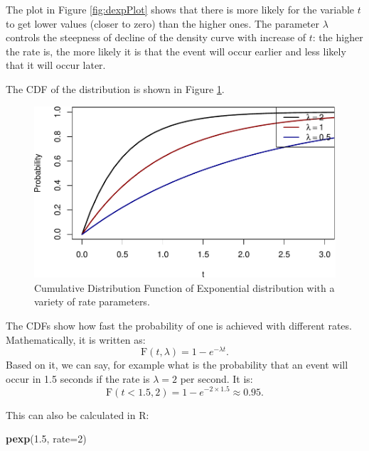 \documentclass[
]{book}
\newenvironment{Shaded}{\begin{snugshade}}{\end{snugshade}}
\newcommand{\DataTypeTok}[1]{\textcolor[rgb]{0.13,0.29,0.53}{#1}}
\newcommand{\DecValTok}[1]{\textcolor[rgb]{0.00,0.00,0.81}{#1}}
\newcommand{\FloatTok}[1]{\textcolor[rgb]{0.00,0.00,0.81}{#1}}
\newcommand{\KeywordTok}[1]{\textcolor[rgb]{0.13,0.29,0.53}{\textbf{#1}}}
\newcommand{\NormalTok}[1]{#1}
\theoremstyle{definition}
\theoremstyle{definition}
\theoremstyle{definition}
\theoremstyle{definition}
\theoremstyle{remark}
\begin{document}
The plot in Figure \ref{fig:dexpPlot} shows that there is more likely for the variable \(t\) to get lower values (closer to zero) than the higher ones. The parameter \(\lambda\) controls the steepness of decline of the density curve with increase of \(t\): the higher the rate is, the more likely it is that the event will occur earlier and less likely that it will occur later.

The CDF of the distribution is shown in Figure \ref{fig:pexpPlot}.

\begin{figure}
\centering
\includegraphics{Svetunkov---Statistics-for-Business-Analytics_files/figure-latex/pexpPlot-1.pdf}
\caption{\label{fig:pexpPlot}Cumulative Distribution Function of Exponential distribution with a variety of rate parameters.}
\end{figure}

The CDFs show how fast the probability of one is achieved with different rates. Mathematically, it is written as:
\begin{equation}
    \mathrm{F}(t, \lambda) = 1 - e^{- \lambda t}.
    \label{eq:ExponentialCDF}
\end{equation}
Based on it, we can say, for example what is the probability that an event will occur in 1.5 seconds if the rate is \(\lambda=2\) per second. It is:
\begin{equation*}
    \mathrm{F}(t < 1.5, 2) = 1 - e^{- 2 \times 1.5} \approx 0.95 .
\end{equation*}

This can also be calculated in R:

\begin{Shaded}
\begin{Highlighting}[]
\KeywordTok{pexp}\NormalTok{(}\FloatTok{1.5}\NormalTok{, }\DataTypeTok{rate=}\DecValTok{2}\NormalTok{)}
\end{Highlighting}
\end{Shaded}
\end{document}
